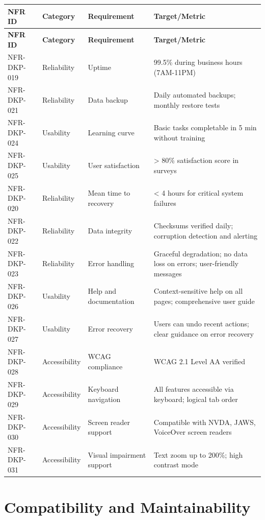 \documentclass[12pt,a4paper]{report}
\begin{document}
\begin{longtable}{|p{2cm}|p{3cm}|p{5.5cm}|p{3.5cm}|}
\hline
\textbf{NFR ID} & \textbf{Category} & \textbf{Requirement} & \textbf{Target/Metric} \\ \hline
\endfirsthead
\hline
\textbf{NFR ID} & \textbf{Category} & \textbf{Requirement} & \textbf{Target/Metric} \\ \hline
\endhead
NFR-DKP-019 & Reliability & Uptime & 99.5\% during business hours (7AM-11PM) \\ \hline
NFR-DKP-021 & Reliability & Data backup & Daily automated backups; monthly restore tests \\ \hline
NFR-DKP-024 & Usability & Learning curve & Basic tasks completable in 5 min without training \\ \hline
NFR-DKP-025 & Usability & User satisfaction & > 80\% satisfaction score in surveys \\ \hline
NFR-DKP-020 & Reliability & Mean time to recovery & < 4 hours for critical system failures \\ \hline
NFR-DKP-022 & Reliability & Data integrity & Checksums verified daily; corruption detection and alerting \\ \hline
NFR-DKP-023 & Reliability & Error handling & Graceful degradation; no data loss on errors; user-friendly messages \\ \hline
NFR-DKP-026 & Usability & Help and documentation & Context-sensitive help on all pages; comprehensive user guide \\ \hline
NFR-DKP-027 & Usability & Error recovery & Users can undo recent actions; clear guidance on error recovery \\ \hline
NFR-DKP-028 & Accessibility & WCAG compliance & WCAG 2.1 Level AA verified \\ \hline
NFR-DKP-029 & Accessibility & Keyboard navigation & All features accessible via keyboard; logical tab order \\ \hline
NFR-DKP-030 & Accessibility & Screen reader support & Compatible with NVDA, JAWS, VoiceOver screen readers \\ \hline
NFR-DKP-031 & Accessibility & Visual impairment support & Text zoom up to 200\%; high contrast mode \\ \hline
\end{longtable}

\section{Compatibility and Maintainability}
\end{document}
